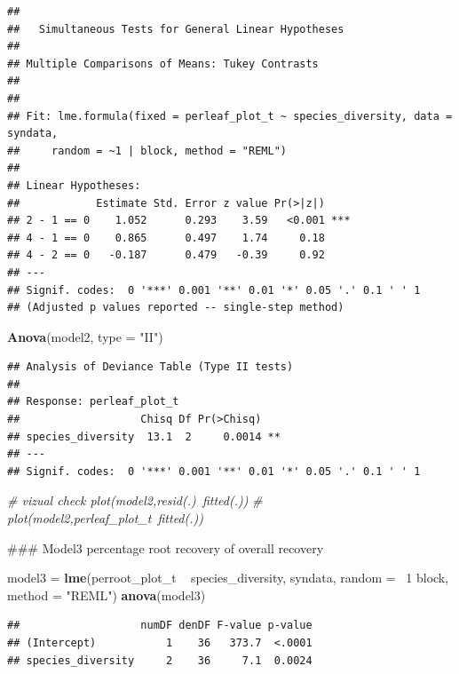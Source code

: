 \documentclass[]{article}
\newenvironment{Shaded}{}{}
\newcommand{\KeywordTok}[1]{\textcolor[rgb]{0.00,0.44,0.13}{\textbf{{#1}}}}
\newcommand{\DataTypeTok}[1]{\textcolor[rgb]{0.56,0.13,0.00}{{#1}}}
\newcommand{\DecValTok}[1]{\textcolor[rgb]{0.25,0.63,0.44}{{#1}}}
\newcommand{\StringTok}[1]{\textcolor[rgb]{0.25,0.44,0.63}{{#1}}}
\newcommand{\CommentTok}[1]{\textcolor[rgb]{0.38,0.63,0.69}{\textit{{#1}}}}
\newcommand{\NormalTok}[1]{{#1}}
\begin{document}
\begin{verbatim}
## 
##   Simultaneous Tests for General Linear Hypotheses
## 
## Multiple Comparisons of Means: Tukey Contrasts
## 
## 
## Fit: lme.formula(fixed = perleaf_plot_t ~ species_diversity, data = syndata, 
##     random = ~1 | block, method = "REML")
## 
## Linear Hypotheses:
##            Estimate Std. Error z value Pr(>|z|)    
## 2 - 1 == 0    1.052      0.293    3.59   <0.001 ***
## 4 - 1 == 0    0.865      0.497    1.74     0.18    
## 4 - 2 == 0   -0.187      0.479   -0.39     0.92    
## ---
## Signif. codes:  0 '***' 0.001 '**' 0.01 '*' 0.05 '.' 0.1 ' ' 1
## (Adjusted p values reported -- single-step method)
\end{verbatim}

\begin{Shaded}
\begin{Highlighting}[]
\KeywordTok{Anova}\NormalTok{(model2, }\DataTypeTok{type =} \StringTok{"II"}\NormalTok{)}
\end{Highlighting}
\end{Shaded}

\begin{verbatim}
## Analysis of Deviance Table (Type II tests)
## 
## Response: perleaf_plot_t
##                   Chisq Df Pr(>Chisq)   
## species_diversity  13.1  2     0.0014 **
## ---
## Signif. codes:  0 '***' 0.001 '**' 0.01 '*' 0.05 '.' 0.1 ' ' 1
\end{verbatim}

\begin{Shaded}
\begin{Highlighting}[]

\CommentTok{# vizual check plot(model2,resid(.)~fitted(.))}
\CommentTok{# plot(model2,perleaf_plot_t~fitted(.))}


\NormalTok{### Model3 percentage root recovery of overall recovery}

\NormalTok{model3 = }\KeywordTok{lme}\NormalTok{(perroot_plot_t ~ species_diversity, syndata, }\DataTypeTok{random =} \NormalTok{~}\DecValTok{1} \NormalTok{\textbar{} block, }
    \DataTypeTok{method =} \StringTok{"REML"}\NormalTok{)}
\KeywordTok{anova}\NormalTok{(model3)}
\end{Highlighting}
\end{Shaded}

\begin{verbatim}
##                   numDF denDF F-value p-value
## (Intercept)           1    36   373.7  <.0001
## species_diversity     2    36     7.1  0.0024
\end{verbatim}
\end{document}
